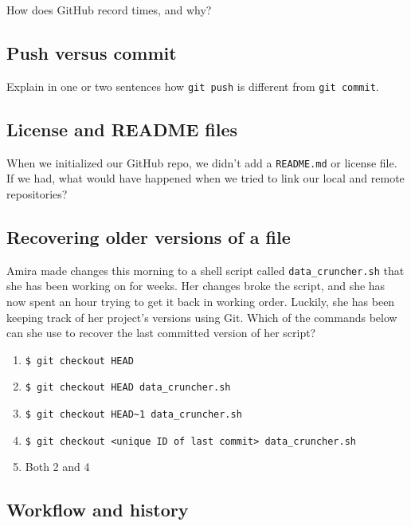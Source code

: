 \documentclass[
]{krantz}
\providecommand{\tightlist}{%
  \setlength{\itemsep}{0pt}\setlength{\parskip}{0pt}}
\begin{document}
How does GitHub record times, and why?

\hypertarget{git-cmdline-ex-push-commit}{%
\subsection{Push versus commit}\label{git-cmdline-ex-push-commit}}

Explain in one or two sentences how \texttt{git\ push} is different from \texttt{git\ commit}.

\hypertarget{git-cmdline-ex-boilerplate}{%
\subsection{License and README files}\label{git-cmdline-ex-boilerplate}}

When we initialized our GitHub repo,
we didn't add a \texttt{README.md} or license file.
If we had,
what would have happened when we tried to link our local and remote repositories?

\hypertarget{git-cmdline-ex-recover}{%
\subsection{Recovering older versions of a file}\label{git-cmdline-ex-recover}}

Amira made changes this morning to a shell script called \texttt{data\_cruncher.sh}
that she has been working on for weeks.
Her changes broke the script,
and she has now spent an hour trying to get it back in working order.
Luckily,
she has been keeping track of her project's versions using Git.
Which of the commands below can she use
to recover the last committed version of her script?

\begin{enumerate}
\def\labelenumi{\arabic{enumi}.}
\tightlist
\item
  \texttt{\$\ git\ checkout\ HEAD}
\item
  \texttt{\$\ git\ checkout\ HEAD\ data\_cruncher.sh}
\item
  \texttt{\$\ git\ checkout\ HEAD\textasciitilde{}1\ data\_cruncher.sh}
\item
  \texttt{\$\ git\ checkout\ \textless{}unique\ ID\ of\ last\ commit\textgreater{}\ data\_cruncher.sh}
\item
  Both 2 and 4
\end{enumerate}

\hypertarget{git-cmdline-ex-history}{%
\subsection{Workflow and history}\label{git-cmdline-ex-history}}
\end{document}
